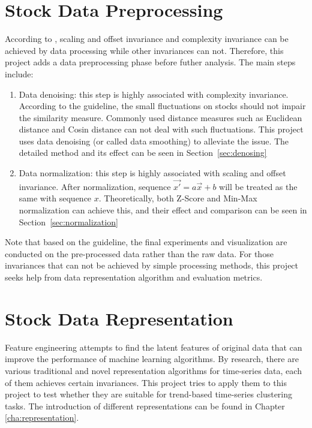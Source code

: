 \section{Stock Data Preprocessing}
\label{sec:Preprocessing}
According to \cite{paparrizos2015k}, scaling and offset invariance and complexity invariance can be achieved by data processing while other invariances can not. Therefore, this project adds a data preprocessing phase before futher analysis. The main steps include:
\begin{enumerate}
    \item Data denoising: this step is highly associated with complexity invariance. According to the guideline, the small fluctuations on stocks should not impair the similarity measure. Commonly used distance measures such as Euclidean distance and Cosin distance can not deal with such fluctuations. This project uses data denoising (or called data smoothing) to alleviate the issue. The detailed method and its effect can be seen in Section~\ref{sec:denosing}
    \item Data normalization: this step is highly associated with scaling and offset invariance. After normalization, sequence $\vec{x\prime} = a\vec{x} + b$ will be treated as the same with sequence $x$. Theoretically, both Z-Score and Min-Max normalization can achieve this, and their effect and comparison can be seen in Section~\ref{sec:normalization}
\end{enumerate}
Note that based on the guideline, the final experiments and visualization are conducted on the pre-processed data rather than the raw data. For those invariances that can not be achieved by simple processing methods, this project seeks help from data representation algorithm and evaluation metrics.

\section{Stock Data Representation}
\label{sec:Feature}
Feature engineering attempts to find the latent features of original data that can improve the performance of machine learning algorithms. By research, there are various traditional and novel representation algorithms for time-series data, each of them achieves certain invariances. This project tries to apply them to this project to test whether they are suitable for trend-based time-series clustering tasks. The introduction of different representations can be found in Chapter \ref{cha:representation}.

